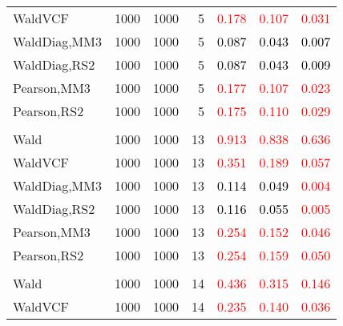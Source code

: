 \documentclass[
]{article}
\begin{document}
\begin{table}[H]
{\begin{tabular}[t]{lrrrrrr}
\hspace{1em}WaldVCF & 1000 & 1000 & 5 & \textcolor{red}{0.178} & \textcolor{red}{0.107} & \textcolor{red}{0.031}\\
\hspace{1em}WaldDiag,MM3 & 1000 & 1000 & 5 & \textcolor{black}{0.087} & \textcolor{black}{0.043} & \textcolor{black}{0.007}\\
\hspace{1em}WaldDiag,RS2 & 1000 & 1000 & 5 & \textcolor{black}{0.087} & \textcolor{black}{0.043} & \textcolor{black}{0.009}\\
\hspace{1em}Pearson,MM3 & 1000 & 1000 & 5 & \textcolor{red}{0.177} & \textcolor{red}{0.107} & \textcolor{red}{0.023}\\
\hspace{1em}Pearson,RS2 & 1000 & 1000 & 5 & \textcolor{red}{0.175} & \textcolor{red}{0.110} & \textcolor{red}{0.029}\\
\addlinespace[0.3em]
\multicolumn{7}{l}{\textbf{1F 15V}}\\
\hspace{1em}Wald & 1000 & 1000 & 13 & \textcolor{red}{0.913} & \textcolor{red}{0.838} & \textcolor{red}{0.636}\\
\hspace{1em}WaldVCF & 1000 & 1000 & 13 & \textcolor{red}{0.351} & \textcolor{red}{0.189} & \textcolor{red}{0.057}\\
\hspace{1em}WaldDiag,MM3 & 1000 & 1000 & 13 & \textcolor{black}{0.114} & \textcolor{black}{0.049} & \textcolor{red}{0.004}\\
\hspace{1em}WaldDiag,RS2 & 1000 & 1000 & 13 & \textcolor{black}{0.116} & \textcolor{black}{0.055} & \textcolor{red}{0.005}\\
\hspace{1em}Pearson,MM3 & 1000 & 1000 & 13 & \textcolor{red}{0.254} & \textcolor{red}{0.152} & \textcolor{red}{0.046}\\
\hspace{1em}Pearson,RS2 & 1000 & 1000 & 13 & \textcolor{red}{0.254} & \textcolor{red}{0.159} & \textcolor{red}{0.050}\\
\addlinespace[0.3em]
\multicolumn{7}{l}{\textbf{2F 10V}}\\
\hspace{1em}Wald & 1000 & 1000 & 14 & \textcolor{red}{0.436} & \textcolor{red}{0.315} & \textcolor{red}{0.146}\\
\hspace{1em}WaldVCF & 1000 & 1000 & 14 & \textcolor{red}{0.235} & \textcolor{red}{0.140} & \textcolor{red}{0.036}\\

\end{tabular}}
\end{table}
\end{document}
